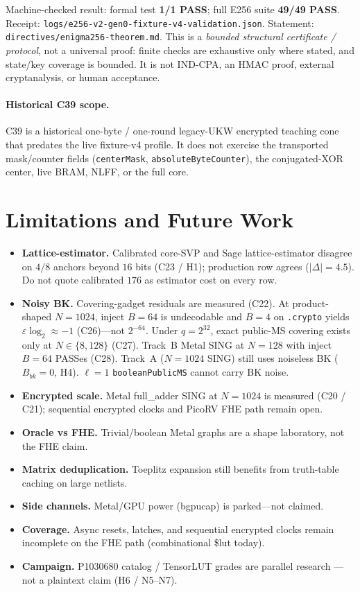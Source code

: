 \documentclass[11pt,a4paper]{article}
\begin{document}
Machine-checked result: formal test \textbf{1/1 PASS}; full E256 suite
\textbf{49/49 PASS}. Receipt:
\texttt{logs/e256-v2-gen0-fixture-v4-validation.json}. Statement:
\texttt{directives/enigma256-theorem.md}.
This is a \emph{bounded structural certificate / protocol}, not a universal
proof: finite checks are exhaustive only where stated, and state/key coverage
is bounded. It is not IND-CPA, an HMAC proof, external cryptanalysis, or human
acceptance.

\paragraph{Historical C39 scope.}
C39 is a historical one-byte / one-round legacy-UKW encrypted teaching cone
that predates the live fixture-v4 profile. It does not exercise the transported
mask/counter fields (\texttt{centerMask}, \texttt{absoluteByteCounter}), the
conjugated-XOR center, live BRAM, NLFF, or the full core.
\section{Limitations and Future Work}
\label{sec:limits}

\begin{itemize}[leftmargin=*,itemsep=2pt]
  \item \textbf{Lattice-estimator.} Calibrated core-SVP and Sage lattice-estimator
        disagree on $4/8$ anchors beyond $16$ bits (C23 / H1); production row
        agrees ($|\Delta|{=}4.5$). Do not quote calibrated $176$ as estimator cost
        on every row.
  \item \textbf{Noisy BK.} Covering-gadget residuals are measured (C22). At
        product-shaped $N{=}1024$, inject $B{=}64$ is undecodable and $B{=}4$ on
        \texttt{.crypto} yields $\varepsilon\log_2\approx -1$ (C26)---not
        $2^{-64}$. Under $q{=}2^{32}$, exact public-MS covering exists only at
        $N\in\{8,128\}$ (C27). Track~B Metal SING at $N{=}128$ with inject
        $B{=}64$ PASSes (C28). Track~A ($N{=}1024$ SING) still uses noiseless BK
        ($B_{bk}{=}0$, H4). $\ell{=}1$ \texttt{booleanPublicMS} cannot carry BK noise.
  \item \textbf{Encrypted scale.} Metal full\_adder SING at $N{=}1024$ is measured
        (C20 / C21); sequential encrypted clocks and PicoRV FHE path remain open.
  \item \textbf{Oracle vs FHE.} Trivial/boolean Metal graphs are a shape laboratory,
        not the FHE claim.
  \item \textbf{Matrix deduplication.} Toeplitz expansion still benefits from
        truth-table caching on large netlists.
  \item \textbf{Side channels.} Metal/GPU power (bgpucap) is parked---not claimed.
  \item \textbf{Coverage.} Async resets, latches, and sequential encrypted clocks
        remain incomplete on the FHE path (combinational \$lut today).
  \item \textbf{Campaign.} P1030680 catalog / TensorLUT grades are parallel research
        ---not a plaintext claim (H6 / N5--N7).
\end{itemize}
\end{document}
